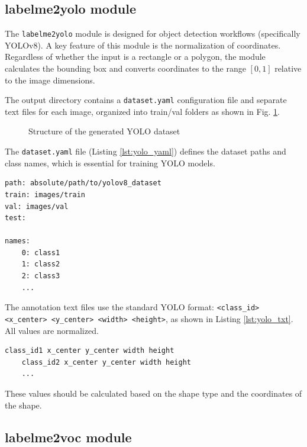 \documentclass[conference]{IEEEtran}
\begin{document}
\subsection{labelme2yolo module}

The \texttt{labelme2yolo} module is designed for object detection workflows
(specifically YOLOv8). A key feature of this module is the normalization of
coordinates. Regardless of whether the input is a rectangle or a polygon, the
module calculates the bounding box and converts coordinates to the range $[0,
1]$ relative to the image dimensions.

The output directory contains a \texttt{dataset.yaml} configuration file and
separate text files for each image, organized into train/val folders as shown
in Fig. \ref{fig:yolo_structure}.

\begin{figure}[htbp]
\caption{Structure of the generated YOLO dataset}
\label{fig:yolo_structure}
\end{figure}

The \texttt{dataset.yaml} file (Listing \ref{lst:yolo_yaml}) defines the
dataset paths and class names, which is essential for training YOLO models.

\begin{lstlisting}[style=json, caption={Example YOLO format dataset.yaml file}, label={lst:yolo_yaml}]
path: absolute/path/to/yolov8_dataset
train: images/train
val: images/val
test:

names:
	0: class1
	1: class2
	2: class3
	...
\end{lstlisting}

The annotation text files use the standard YOLO format: \texttt{<class\_id>
<x\_center> <y\_center> <width> <height>}, as shown in Listing
\ref{lst:yolo_txt}. All values are normalized.

\begin{lstlisting}[style=json, caption={Example YOLO format text file}, label={lst:yolo_txt}]
	class_id1 x_center y_center width height
	class_id2 x_center y_center width height
	...
\end{lstlisting}

These values should be calculated based on the shape type and the
coordinates of the shape.

\subsection{labelme2voc module}
\end{document}
